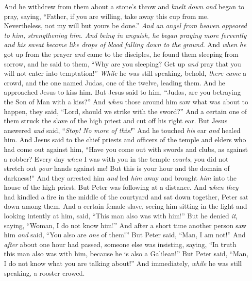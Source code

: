 \begin{biblechapter}
\verse And he withdrew from them about a stone’s throw and \textit{knelt down} \textit{and} began to pray,
\verse saying, “Father, if you are willing, take away this cup from me. Nevertheless, not my will but yours be done.”
\verse \textit{And an angel from heaven appeared to him, strengthening him.
\verse And being in anguish, he began praying more fervently and his sweat became like drops of blood falling down to the ground.}
\verse And \textit{when he} got up from the prayer \textit{and} came to the disciples, he found them sleeping from sorrow,
\verse and he said to them, “Why are you sleeping? Get up \textit{and} pray that you will not enter into temptation!”
 \textit{While} he was still speaking, behold, \textit{there came} a crowd, and the one named Judas, one of the twelve, leading them. And he approached Jesus to kiss him.
\verse But Jesus said to him, “Judas, are you betraying the Son of Man with a kiss?”
\verse And \textit{when} those around him saw what was about to happen, they said, “Lord, should we strike with the sword?”
\verse And a certain one of them struck the slave of the high priest and cut off his right ear.
\verse But Jesus answered \textit{and} said, “\textit{Stop! No more of this!}” And he touched \textit{his} ear \textit{and} healed him.
\verse And Jesus said to the chief priests and officers of the temple and elders who had come out against him, “Have you come out with swords and clubs, as against a robber?
\verse Every day \textit{when} I was with you in the temple \textit{courts}, you did not stretch out \textit{your} hands against me! But this is your hour and the domain of darkness!”
 And they arrested him \textit{and} led \textit{him} away and brought \textit{him} into the house of the high priest. But Peter was following at a distance.
\verse And \textit{when they} had kindled a fire in the middle of the courtyard and sat down together, Peter sat down among them.
\verse And a certain female slave, seeing him sitting in the light and looking intently at him, said, “This man also was with him!”
\verse But he denied \textit{it}, saying, “Woman, I do not know him!”
\verse And after a short time another person saw him \textit{and} said, “You also are \textit{one} of them!” But Peter said, “Man, I am not!”
\verse And \textit{after} about one hour had passed, someone else was insisting, saying, “In truth this man also was with him, because he is also a Galilean!”
\verse But Peter said, “Man, I do not know what you are talking about!” And immediately, \textit{while} he was still speaking, a rooster crowed.

\end{biblechapter}

